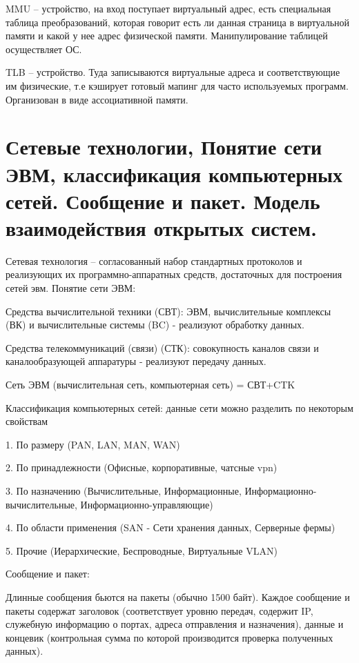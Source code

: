 \documentclass{article}
\begin{document}
MMU – устройство, на вход поступает виртуальный адрес, есть специальная таблица преобразований, которая говорит есть ли данная страница в виртуальной 
памяти и какой у нее адрес физической памяти. Манипулирование таблицей осуществляет ОС. 

TLB – устройство. Туда записываются виртуальные адреса и соответствующие им физические, т.е кэширует готовый мапинг для часто используемых программ. 
Организован в виде ассоциативной памяти.  


\section{Сетевые технологии, Понятие сети ЭВМ, классификация компьютерных сетей. Сообщение и пакет. Модель взаимодействия открытых систем.}
Сетевая технология – согласованный набор стандартных протоколов и реализующих их программно-аппаратных средств, достаточных для построения сетей эвм.
Понятие сети ЭВМ:

Средства вычислительной техники (СВТ): ЭВМ, вычислительные комплексы (ВК) и вычислительные системы (BC) - реализуют обработку данных.


Средства телекоммуникаций (связи) (СТК): совокупность каналов связи и каналообразующей аппаратуры - реализуют передачу данных.


Сеть ЭВМ (вычислительная сеть, компьютерная сеть) = СВТ+CTK

Классификация компьютерных сетей: данные сети можно разделить по некоторым свойствам

1. По размеру (PAN, LAN, MAN, WAN)

2. По принадлежности (Офисные, корпоративные, чатсные vpn)

3. По назначению (Вычислительные, Информационные, Информационно-вычислительные, Информационно-управляющие)

4. По области применения (SAN - Сети хранения данных, Серверные фермы)

5. Прочие (Иерархические, Беспроводные, Виртуальные VLAN)


Сообщение и пакет:

Длинные сообщения бьются на пакеты (обычно 1500 байт). 
Каждое сообщение и пакеты содержат заголовок (соответствует уровню передач, содержит IP, служебную информацию о портах, адреса отправления и назначения), 
данные и концевик (контрольная сумма по которой производится проверка полученных данных).
\end{document}
